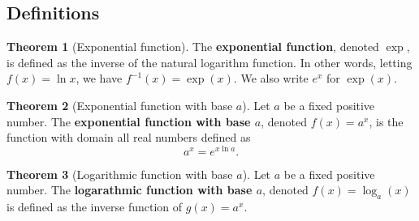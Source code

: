 \documentclass[11pt]{article}
\theoremstyle{definition}
\newtheorem*{comment}{Comment}
\theoremstyle{named}
\newtheorem*{namedtheorem}{Theorem}
\numberwithin{myalgctr}{section}
\begin{document}
\thispagestyle{fancy}
\subsection*{Definitions}
\begin{namedtheorem}[Exponential function] The {\bf exponential function}, denoted $\exp$, is defined as the inverse of the natural logarithm function. In other words, letting $f(x)=\ln x$, we have $f^{-1}(x)=\exp(x)$. We also write $e^x$ for $\exp(x)$.
\end{namedtheorem}
\begin{namedtheorem}[Exponential function with base $a$] Let $a$ be a fixed positive number. The {\bf exponential function with base $a$}, denoted $f(x)=a^x$, is the function with domain all real numbers defined as
  \[
  a^x=e^{x\ln a}.
  \]

\end{namedtheorem}
\begin{namedtheorem}[Logarithmic function with base $a$] Let $a$ be a fixed positive number. The {\bf logarathmic function with base $a$}, denoted $f(x)=\log_a(x)$ is defined as the inverse function of $g(x)=a^x$.

\end{namedtheorem}

\end{document}
